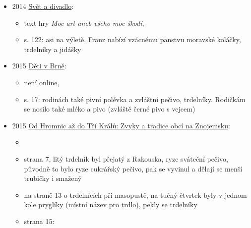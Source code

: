\begin{itemize}
  \begin{itemize}
  \tightlist
  \item
    reklama na formičky na trdelník od Tescomy
  \end{itemize}
\item
  2014
  \href{https://www.digitalniknihovna.cz/mzk/uuid/uuid:2dcdcde1-ffc5-11e4-8ded-5ef3fc9ae867}{Svět
  a divadlo}:

  \begin{itemize}
  \tightlist
  \item
    text hry \emph{Moc art aneb všeho moc škodí},
  \item
    s. 122: asi na výletě, Franz nabízí vzácnému panstvu moravské
    koláčky, trdelníky a jidášky
  \end{itemize}
\item
  2015
  \href{https://www.digitalniknihovna.cz/knav/uuid/uuid:afbe9c38-0381-432b-a157-ea5259f44a89}{Děti
  v Brně}:

  \begin{itemize}
  \tightlist
  \item
    není online, 
  \item
    s. 17: rodinách také pivní polévka a zvláštní pečivo, trdelníky.
    Rodičkám se nosilo také mléko a pivo (zvláště černé pivo s vejcem)
  \end{itemize}
\item
  2015
  \href{http://zivepomezi.cz/wp-content/uploads/2014/12/Publikace-zvyky_vnit.blok_.pdf}{Od
  Hromnic až do Tří Králů: Zvyky a tradice obcí na Znojemsku}:

  \begin{itemize}
  \tightlist
  \item
  \item
    strana 7, litý trdelník byl přejatý z Rakouska, ryze sváteční
    pečivo, původně to bylo ryze cukrářský pečivo, pak se vyvinul a
    dělají se menší trubičky i smažený
  \item
    na straně 13 o trdelnících při masopustě, na tučný čtvrtek byly v
    jednom kole pryglíky (místní název pro trdlo), pekly se trdelníky
  \item
    strana 15:


\end{itemize}
\end{itemize}
